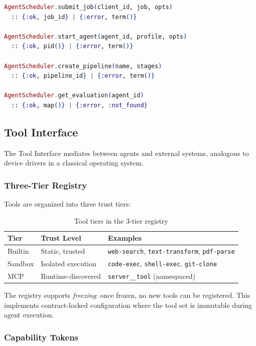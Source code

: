 \documentclass[12pt,a4paper]{article}
\theoremstyle{definition}
\begin{document}
\begin{lstlisting}[language=elixir, caption={Agent Scheduler public API}]
AgentScheduler.submit_job(client_id, job, opts)
  :: {:ok, job_id} | {:error, term()}

AgentScheduler.start_agent(agent_id, profile, opts)
  :: {:ok, pid()} | {:error, term()}

AgentScheduler.create_pipeline(name, stages)
  :: {:ok, pipeline_id} | {:error, term()}

AgentScheduler.get_evaluation(agent_id)
  :: {:ok, map()} | {:error, :not_found}
\end{lstlisting}

\subsection{Tool Interface}\label{subsec:tools}

The Tool Interface mediates between agents and external systems, analogous to
device drivers in a classical operating system.

\subsubsection{Three-Tier Registry}

Tools are organized into three trust tiers:

\begin{table}[H]
\centering
\caption{Tool tiers in the 3-tier registry}
\begin{tabular}{lll}
\toprule
\textbf{Tier} & \textbf{Trust Level} & \textbf{Examples} \\
\midrule
Builtin  & Static, trusted   & \texttt{web-search}, \texttt{text-transform}, \texttt{pdf-parse} \\
Sandbox  & Isolated execution & \texttt{code-exec}, \texttt{shell-exec}, \texttt{git-clone} \\
MCP      & Runtime-discovered & \texttt{server\_\_tool} (namespaced) \\
\bottomrule
\end{tabular}
\end{table}

The registry supports \emph{freezing}: once frozen, no new tools can be registered.
This implements contract-locked configuration where the tool set is immutable during
agent execution.

\subsubsection{Capability Tokens}
\end{document}
